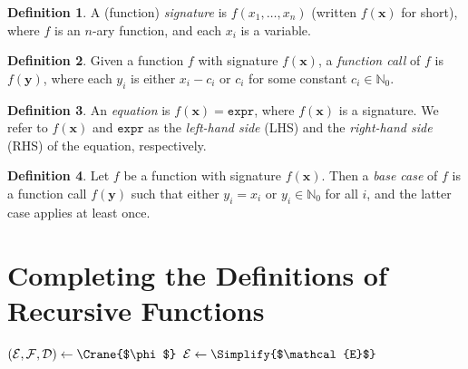 \documentclass{article}
\theoremstyle{definition}
\newtheorem{definition}{Definition}
\newcommand{\expr}{\mathtt{expr}}
\begin{document}
\begin{definition}
  A (function) \emph{signature} is $f(x_{1}, \dots, x_{n})$ (written
  $f(\mathbf{x})$ for short), where $f$ is an $n$-ary function, and each $x_{i}$
  is a variable.
\end{definition}

\begin{definition}
  Given a function $f$ with signature $f(\mathbf{x})$, a \emph{function call} of
  $f$ is $f(\mathbf{y})$, where each $y_{i}$ is either $x_{i} - c_{i}$ or
  $c_{i}$ for some constant $c_{i} \in \mathbb{N}_{0}$.
\end{definition}

\begin{definition}
  An \emph{equation} is $f(\mathbf{x}) = \expr{}$, where $f(\mathbf{x})$ is a
  signature. We refer to $f(\mathbf{x})$ and $\expr{}$ as the \emph{left-hand
    side} (LHS) and the \emph{right-hand side} (RHS) of the equation,
  respectively.
\end{definition}

\begin{definition}\label{def:basecase}
  Let $f$ be a function with signature $f(\mathbf{x})$. Then a \emph{base case}
  of $f$ is a function call $f(\mathbf{y})$ such that either $y_{i} = x_{i}$ or
  $y_{i} \in \mathbb{N}_{0}$ for all $i$, and the latter case applies at least
  once.
\end{definition}

\section{Completing the Definitions of Recursive Functions}\label{sec:main}

\begin{algorithm}[t]
  \caption{\protect\CompileWithBaseCases{$\phi$}}\label{alg:main}
  $(\mathcal{E}, \mathcal{F}, \mathcal{D}) \gets \Crane{$\phi$}$\;\label{line:first}
  $\mathcal{E} \gets \Simplify{$\mathcal{E}$}$\;\label{line:second}
\end{algorithm}
\end{document}
